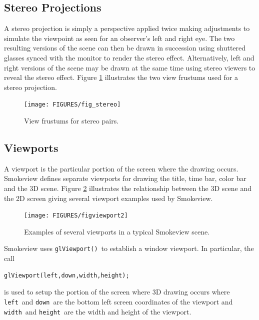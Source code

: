 \documentclass[11pt,twoside]{book}
\newcommand{\figoptions}{htp}
\begin{document}
\subsection{Stereo Projections}

A stereo projection is simply a perspective applied twice making
adjustments to simulate the viewpoint as seen for an observer's
left and right eye.  The two resulting versions of the scene can
then be drawn in succession using shuttered glasses synced with
the monitor to render the stereo effect.  Alternatively, left and
right versions of the scene may be drawn at the same time using
stereo viewers to reveal the stereo effect.  Figure
\ref{figstereo} illustrates the two view frustums used for a
stereo projection.

\begin{figure}[\figoptions]
\begin{center}
\texttt{[image: FIGURES/fig\_stereo]}
\end{center}
\caption{View frustums for stereo pairs.}
 \label{figstereo}
\end{figure}

\subsection{Viewports}
A viewport is the particular portion of the screen where the
drawing occurs.  Smokeview defines separate viewports for drawing
the title, time bar, color bar and the 3D scene.  Figure
\ref{figviewports} illustrates the relationship between the 3D
scene and the 2D screen giving several viewport examples used by
Smokeview.
\begin{figure}[\figoptions]
\begin{center}
\texttt{[image: FIGURES/figviewport2]}
\end{center}
\caption{Examples of several viewports in a typical Smokeview scene.}
 \label{figviewports}
\end{figure}

Smokeview uses {\tt glViewport()}\ to establish a window viewport.  In particular, the call
\begin{verbatim}
glViewport(left,down,width,height);
\end{verbatim}
is used to setup the portion of the screen where 3D drawing occurs where {\tt left}\
and {\tt down}\ are the bottom left screen coordinates of the viewport and {\tt width}\
and {\tt height}\ are the width and height of the viewport.

%
%
\end{document}
